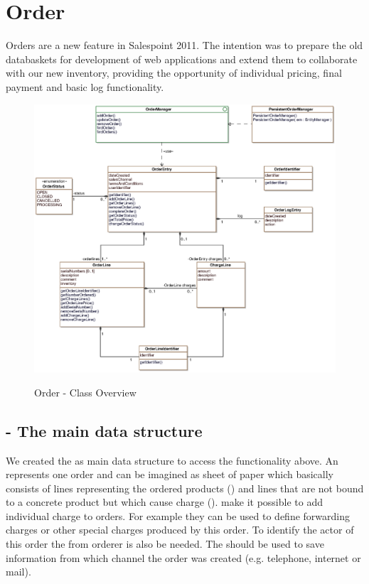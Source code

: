 \newpage
\section{Order}
Orders are a new feature in Salespoint 2011. The intention was to prepare the old databaskets for development of web applications and extend them to collaborate with our new inventory, providing the opportunity of individual pricing, final payment and basic log functionality.

\begin{figure}[ht]
	\centering
  \includegraphics[width=1.0\textwidth]{images/Order_Overview.eps}
	\label{order_overview}
	\caption{Order - Class Overview}
\end{figure}

\subsection{ - The main data structure}
We created the  as main data structure to access the functionality above. An  represents one order and can be imagined as sheet of paper which basically consists of lines representing the ordered products () and lines that are not bound to a concrete product but which cause charge ().  make it possible to add individual charge to orders. For example they can be used to define forwarding charges or other special charges produced by this order.
To identify the actor of this order the  from orderer is also be needed. The  should be used to save information from which channel the order was created (e.g. telephone, internet or mail).

